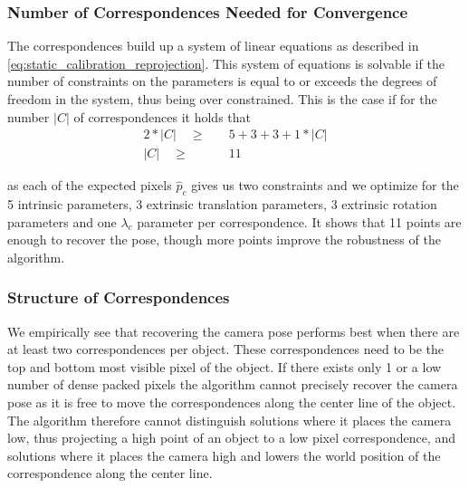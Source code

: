 \subsubsection{Number of Correspondences Needed for Convergence}
\label{sec:static_calibration_number_points}
The correspondences build up a system of linear equations as described in \autoref{eq:static_calibration_reprojection}.
This system of equations is solvable if the number of constraints on the parameters is equal to or exceeds the degrees of freedom in the system, thus being over constrained.
This is the case if for the number $\left\lvert C \right\rvert$ of correspondences it holds that
\begin{equation}
  \begin{split}
  2 * \left\lvert C \right\rvert \quad \geq& \quad 5 + 3 + 3 + 1 * \left\lvert C \right\rvert \\
  \left\lvert C \right\rvert \quad \geq& \quad 11 
\end{split}
\end{equation} 

as each of the expected pixels $\hat{p}_c$ gives us two constraints and we optimize for the 5 intrinsic parameters, 3 extrinsic translation parameters, 3 extrinsic rotation parameters and one $\lambda_c$ parameter per correspondence.
It shows that 11 points are enough to recover the pose, though more points improve the robustness of the algorithm.


\subsubsection{Structure of Correspondences}
We empirically see that recovering the camera pose performs best when there are at least two correspondences per object.
These correspondences need to be the top and bottom most visible pixel of the object.
If there exists only 1 or a low number of dense packed pixels the algorithm cannot precisely recover the camera pose as it is free to move the correspondences along the center line of the object.
The algorithm therefore cannot distinguish solutions where it places the camera low, thus projecting a high point of an object to a low pixel correspondence, and solutions where it places the camera high and lowers the world position of the correspondence along the center line.

